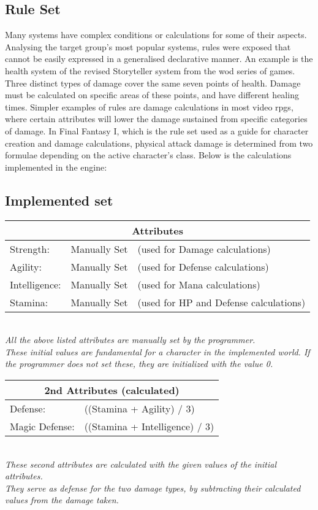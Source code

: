 \subsection{\langname{} Rule Set}
\label{language:ruleset}
Many systems have complex conditions or calculations for some of their aspects.
Analysing the target group's most popular systems, rules were exposed that cannot be easily expressed in a generalised declarative manner.
An example is the health system of the revised Storyteller system from the \ac{wod} series of games. Three distinct types of damage cover the same seven points of health. Damage must be calculated on specific areas of these points, and have different healing times.
Simpler examples of rules are damage calculations in most video \ac{rpgs},
where certain attributes will lower the damage sustained from specific categories of damage. In Final Fantasy I, which is the rule set used as a guide for character creation and damage calculations, physical attack damage is determined from two formulae depending on the active character's class. Below is the calculations implemented in the engine:

\subsection{Implemented set}
\label{language:implset}
\begin{center}
\begin{tabular}{|l l l|}
\hline
\multicolumn{3}{|c|}{\textbf{Attributes}}\\
\hline
Strength: & Manually Set & (used for Damage calculations)\\
\hline
Agility: & Manually Set	 & (used for Defense calculations)\\
\hline
Intelligence: & Manually Set & (used for Mana calculations)\\
\hline
Stamina: & Manually Set & (used for HP and Defense calculations)\\
\hline
\end{tabular}\\
\emph{All the above listed attributes are manually set by the programmer.\\ These initial values are fundamental for a character in the implemented world. If the programmer does not set these, they are initialized with the value 0.}
\end{center}

\begin{center}
\begin{tabular}{|l l|}
\hline
\multicolumn{2}{|c|}{\textbf{2nd Attributes (calculated)}}\\
\hline
Defense: & ((Stamina + Agility) / 3)\\
\hline
Magic Defense: & ((Stamina + Intelligence) / 3)\\
\hline	
\end{tabular}\\
\emph{These second attributes are calculated with the given values of the initial attributes.\\ They serve as defense for the two damage types, by subtracting their calculated values from the damage taken.}
\end{center}

